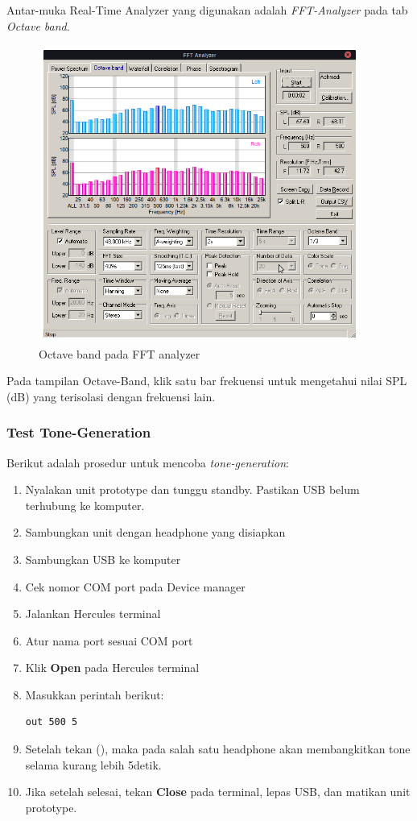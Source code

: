 \documentclass[12pt,]{article}
\begin{document}
	Antar-muka Real-Time Analyzer yang digunakan adalah \textit{FFT-Analyzer} pada tab \textit{Octave band}.
	
	\begin{figure}[!ht]
		\centering
		\includegraphics[width=300pt]{images/kemar/fft}
		\caption{Octave band pada FFT analyzer}
	\end{figure}
	
	Pada tampilan Octave-Band, klik satu bar frekuensi untuk mengetahui nilai SPL (dB)
	yang terisolasi dengan frekuensi lain.
	
	\newpage
	\subsubsection{Test Tone-Generation}
	Berikut adalah prosedur untuk mencoba \textit{tone-generation}:
	\begin{enumerate}
		\item Nyalakan unit prototype dan tunggu standby.
		Pastikan USB belum terhubung ke komputer.
		\item Sambungkan unit dengan headphone yang disiapkan
		\item Sambungkan USB ke komputer
		\item Cek nomor COM port pada Device manager
		\item Jalankan Hercules terminal
		\item Atur nama port sesuai COM port
		\item Klik \textbf{Open} pada Hercules terminal
		\item Masukkan perintah berikut:
		\begin{verbatim}
out 500 5
		\end{verbatim}
		\item Setelah tekan (\keys{\return}), maka pada salah satu headphone
		akan membangkitkan tone selama kurang lebih 5detik.
		\item Jika setelah selesai, tekan \textbf{Close} pada terminal,
		lepas USB, dan matikan unit prototype.
		
	\end{enumerate}
	
\end{document}
